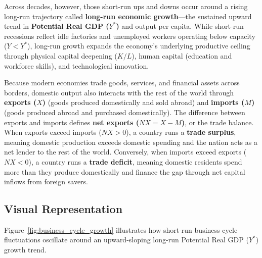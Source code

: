 \documentclass[11pt,letterpaper]{article}
\begin{document}
Across decades, however, those short-run ups and downs occur around a rising long-run trajectory called \textbf{long-run economic growth}—the sustained upward trend in \textbf{Potential Real GDP ($Y^*$)} and output per capita. While short-run recessions reflect idle factories and unemployed workers operating below capacity ($Y < Y^*$), long-run growth expands the economy's underlying productive ceiling through physical capital deepening ($K/L$), human capital (education and workforce skills), and technological innovation.

Because modern economies trade goods, services, and financial assets across borders, domestic output also interacts with the rest of the world through \textbf{exports ($X$)} (goods produced domestically and sold abroad) and \textbf{imports ($M$)} (goods produced abroad and purchased domestically). The difference between exports and imports defines \textbf{net exports ($NX = X - M$)}, or the trade balance. When exports exceed imports ($NX > 0$), a country runs a \textbf{trade surplus}, meaning domestic production exceeds domestic spending and the nation acts as a net lender to the rest of the world. Conversely, when imports exceed exports ($NX < 0$), a country runs a \textbf{trade deficit}, meaning domestic residents spend more than they produce domestically and finance the gap through net capital inflows from foreign savers.

\subsection*{Visual Representation}
Figure~\ref{fig:business_cycle_growth} illustrates how short-run business cycle fluctuations oscillate around an upward-sloping long-run Potential Real GDP ($Y^*$) growth trend.
\end{document}
